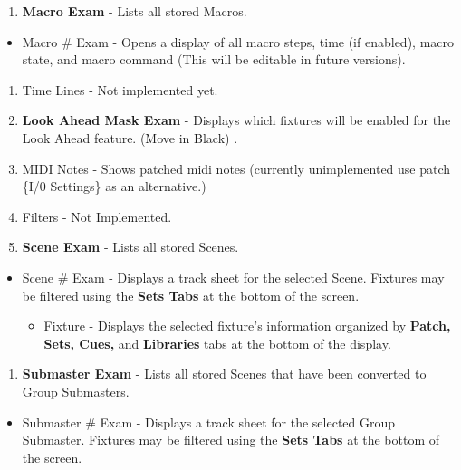 \documentclass[
]{article}
\providecommand{\tightlist}{%
  \setlength{\itemsep}{0pt}\setlength{\parskip}{0pt}}
\begin{document}
\begin{enumerate}
\def\labelenumi{\arabic{enumi}.}
\setcounter{enumi}{4}
\tightlist
\item
  \textbf{Macro Exam} - Lists all stored Macros.
\end{enumerate}

\begin{itemize}
\tightlist
\item
  Macro \# Exam - Opens a display of all macro steps, time (if enabled), macro state, and macro command {(This will be editable in future versions).}
\end{itemize}

\begin{enumerate}
\def\labelenumi{\arabic{enumi}.}
\setcounter{enumi}{5}
\item
  {Time Lines - Not implemented yet. }
\item
  \textbf{Look Ahead Mask Exam} - Displays which fixtures will be enabled for the Look Ahead feature. (Move in Black) .
\item
  {MIDI Notes - Shows patched midi notes (currently unimplemented use patch \{I/0 Settings\} as an alternative.) }
\item
  {Filters - Not Implemented.}
\item
  \textbf{Scene Exam} - Lists all stored Scenes.
\end{enumerate}

\begin{itemize}
\item
  Scene \# Exam - Displays a track sheet for the selected Scene. Fixtures may be filtered using the \textbf{Sets Tabs} at the bottom of the screen.

  \begin{itemize}
  \tightlist
  \item
    Fixture - Displays the selected fixture's information organized by \textbf{Patch, Sets, Cues,} and \textbf{Libraries} tabs at the bottom of the display.
  \end{itemize}
\end{itemize}

\begin{enumerate}
\def\labelenumi{\arabic{enumi}.}
\setcounter{enumi}{10}
\tightlist
\item
  \textbf{Submaster Exam} - Lists all stored Scenes that have been converted to Group Submasters.
\end{enumerate}

\begin{itemize}
\tightlist
\item
  Submaster \# Exam - Displays a track sheet for the selected Group Submaster. Fixtures may be filtered using the \textbf{Sets Tabs} at the bottom of the screen.
\end{itemize}
\end{document}
